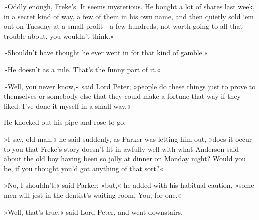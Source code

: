»Oddly enough, Freke's. It seems mysterious. He bought a lot of shares last week, in a secret kind of way, a few of them in his own name, and then quietly sold `em out on Tuesday at a small profit—a few hundreds, not worth going to all that trouble about, you wouldn't think.«

»Shouldn't have thought he ever went in for that kind of gamble.«

»He doesn't as a rule. That's the funny part of it.«

»Well, you never know,« said Lord Peter; »people do these things just to prove to themselves or somebody else that they could make a fortune that way if they liked. I've done it myself in a small way.«

He knocked out his pipe and rose to go.

»I say, old man,« he said suddenly, as Parker was letting him out, »does it occur to you that Freke's story doesn't fit in awfully well with what Anderson said about the old boy having been so jolly at dinner on Monday night? Would you be, if you thought you'd got anything of that sort?«

»No, I shouldn't,« said Parker; »but,« he added with his habitual caution, »some men will jest in the dentist's waiting-room. You, for one.«

»Well, that's true,« said Lord Peter, and went downstairs.
